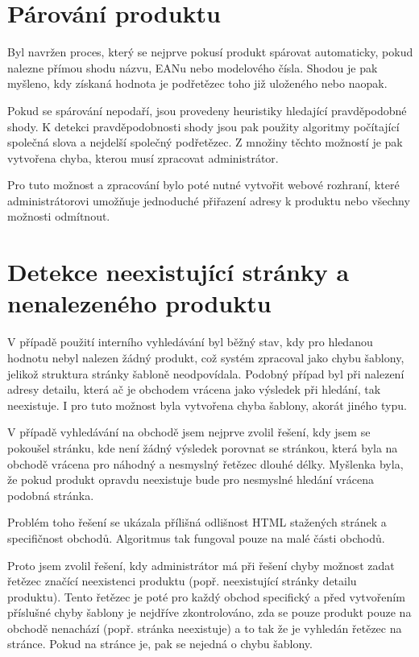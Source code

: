 \documentclass[thesis=B,czech]{FITthesis}[2012/06/26]
\begin{document}
\section{Párování produktu}
Byl navržen proces, který se nejprve pokusí produkt spárovat automaticky, pokud nalezne přímou shodu názvu, EANu nebo modelového čísla.
Shodou je pak myšleno, kdy získaná hodnota je podřetězec toho již uloženého nebo naopak.
\par
Pokud se spárování nepodaří, jsou provedeny heuristiky hledající pravděpodobné shody. K detekci pravděpodobnosti shody jsou pak použity
algoritmy počítající společná slova a nejdelší společný podřetězec. Z množiny těchto možností je pak vytvořena chyba, kterou musí zpracovat administrátor.
\par 
Pro tuto možnost a zpracování bylo poté nutné vytvořit webové rozhraní, které administrátorovi umožňuje jednoduché přiřazení 
adresy k produktu nebo všechny možnosti odmítnout.


\section{Detekce neexistující stránky a nenalezeného produktu}
V případě použití interního vyhledávání byl běžný stav, kdy pro hledanou hodnotu nebyl nalezen žádný produkt, což 
systém zpracoval jako chybu šablony, jelikož struktura stránky šabloně neodpovídala. Podobný případ byl při nalezení adresy detailu, která
ač je obchodem vrácena jako výsledek při hledání, tak neexistuje. I pro tuto možnost byla vytvořena chyba šablony, akorát jiného typu.
\par
V případě vyhledávání na obchodě jsem nejprve zvolil řešení, kdy jsem se pokoušel stránku, kde není žádný výsledek porovnat se stránkou, která
byla na obchodě vrácena pro náhodný a nesmyslný řetězec dlouhé délky. Myšlenka byla, že pokud produkt opravdu neexistuje bude
pro nesmyslné hledání vrácena podobná stránka.
\par
Problém toho řešení se ukázala přílišná odlišnost HTML stažených stránek a specifičnost obchodů. Algoritmus tak fungoval
pouze na malé části obchodů.
\par
Proto jsem zvolil řešení, kdy administrátor má při řešení chyby možnost zadat řetězec značící neexistenci produktu (popř. neexistující stránky detailu produktu). Tento řetězec je poté pro každý obchod specifický a před vytvořením příslušné chyby šablony je nejdříve zkontrolováno, zda
se pouze produkt pouze na obchodě nenachází (popř. stránka neexistuje) a to tak že je vyhledán řetězec na stránce. Pokud na stránce je, pak
se nejedná o chybu šablony.
\end{document}
